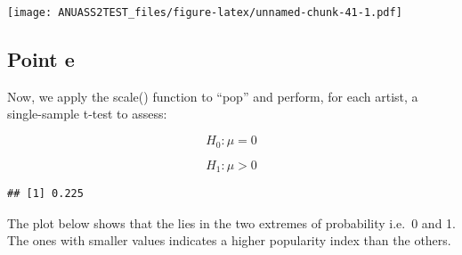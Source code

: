 \documentclass[
]{article}
\newenvironment{Shaded}{\begin{snugshade}}{\end{snugshade}}
\newcommand{\AttributeTok}[1]{\textcolor[rgb]{0.77,0.63,0.00}{#1}}
\newcommand{\CommentTok}[1]{\textcolor[rgb]{0.56,0.35,0.01}{\textit{#1}}}
\newcommand{\ControlFlowTok}[1]{\textcolor[rgb]{0.13,0.29,0.53}{\textbf{#1}}}
\newcommand{\DecValTok}[1]{\textcolor[rgb]{0.00,0.00,0.81}{#1}}
\newcommand{\FloatTok}[1]{\textcolor[rgb]{0.00,0.00,0.81}{#1}}
\newcommand{\FunctionTok}[1]{\textcolor[rgb]{0.00,0.00,0.00}{#1}}
\newcommand{\NormalTok}[1]{#1}
\newcommand{\OtherTok}[1]{\textcolor[rgb]{0.56,0.35,0.01}{#1}}
\newcommand{\SpecialCharTok}[1]{\textcolor[rgb]{0.00,0.00,0.00}{#1}}
\newcommand{\StringTok}[1]{\textcolor[rgb]{0.31,0.60,0.02}{#1}}
\begin{document}
\texttt{[image: ANUASS2TEST\_files/figure-latex/unnamed-chunk-41-1.pdf]}

\hypertarget{point-e-2}{%
\subsection{Point e}\label{point-e-2}}

Now, we apply the scale() function to ``pop'' and perform, for each
artist, a single-sample t-test to assess:

\[
H_0: \mu = 0
\]

\[
H_1: \mu > 0
\]

\begin{Shaded}
\end{Shaded}

\begin{verbatim}
## [1] 0.225
\end{verbatim}

The plot below shows that the lies in the two extremes of probability
i.e.~0 and 1. The ones with smaller values indicates a higher popularity
index than the others.
\end{document}
